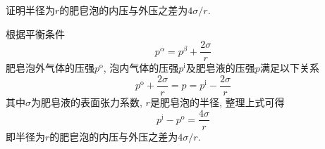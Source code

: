 \begin{problem}[3.14]
证明半径为$r$的肥皀泡的内压与外压之差为$4\sigma/r$.
\end{problem}
\begin{solution}
根据平衡条件
\begin{equation}\tag{3.6.6}
p^\alpha = p^\beta + \frac{2\sigma}{r}
\end{equation}
肥皂泡外气体的压强$p^\mathrm{o}$, 泡内气体的压强$p^\mathrm{i}$及肥皂液的压强$p$满足以下关系
\[
p^\mathrm{o} + \frac{2\sigma}{r} = p =  p^\mathrm{i} - \frac{2\sigma}{r}
\]
其中$\sigma$为肥皂液的表面张力系数, $r$是肥皂泡的半径, 整理上式可得
\[
p^\mathrm{i} - p^\mathrm{o} = \frac{4\sigma}{r}
\]
即半径为$r$的肥皀泡的内压与外压之差为$4\sigma/r$.
\end{solution}
